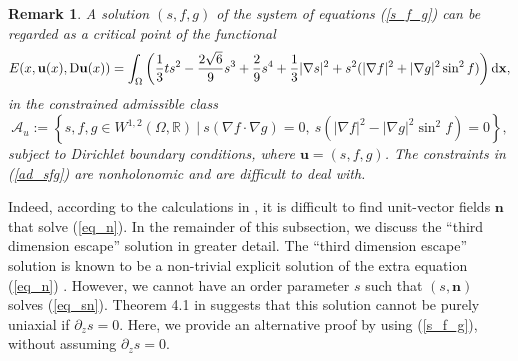 \documentclass[10pt, a4paper]{article}
\newtheorem*{rem}{Remark}
\newcommand\dd{\mathrm{d}}
\newcommand\n{\mathbf{n}}
\newcommand\x{\mathbf{x}}
\newcommand\pp{\partial}
\begin{document}
\begin{rem}
A solution $(s, f, g)$ of the system of equations (\ref{s_f_g}) can be regarded as a critical point of the functional 
\begin{equation}\label{fun_sfg}
E(x, \mathbf{u}(x), {\rm D} \mathbf{u}(x)) = \int_{\Omega} \left(  \frac{1}{3} ts^2 - \frac{2 \sqrt{6}}{9} s^3 + \frac{2}{9} s^4 + \frac{1}{3} |\nabla s|^2  + s^2 (|\nabla f|^2 + |\nabla g|^2 \sin^2 f) \right) \dd \x,
\end{equation}
in the constrained admissible class 
\begin{equation}\label{ad_sfg}
\mathcal{A}_u := \left\{ s, f, g \in W^{1,2}(\Omega, \mathbb{R}) ~|~ s (\nabla f \cdot \nabla g) = 0,~ s (|\nabla f|^2 - |\nabla g|^2 \sin^2 f) = 0   \right\},
\end{equation} 
subject to Dirichlet boundary conditions, where $\mathbf{u} = (s, f, g)$. The constraints in (\ref{ad_sfg}) 
are nonholonomic  \cite{giaquinta2013calculus} and are difficult to deal with.
\end{rem}

Indeed, according to the calculations in \cite{Biscari2006}, it is difficult to find unit-vector fields $\n$ that solve (\ref{eq_n}).  %
In the remainder of this subsection, we discuss the ``third dimension escape'' solution \cite{Cladis1972} in greater detail. 
The ``third dimension escape'' solution is known to be a non-trivial explicit solution of the extra equation (\ref{eq_n}) \cite{Biscari2006, lamy2015uniaxial}. However, we cannot have an order parameter $s$ such that $(s, \n)$ solves (\ref{eq_sn}).  Theorem 4.1 in \cite{lamy2015uniaxial} suggests that this solution cannot be purely uniaxial if $\pp_z s = 0$. Here, we provide an alternative proof by using (\ref{s_f_g}), without assuming $\pp_z s = 0$.
\end{document}

